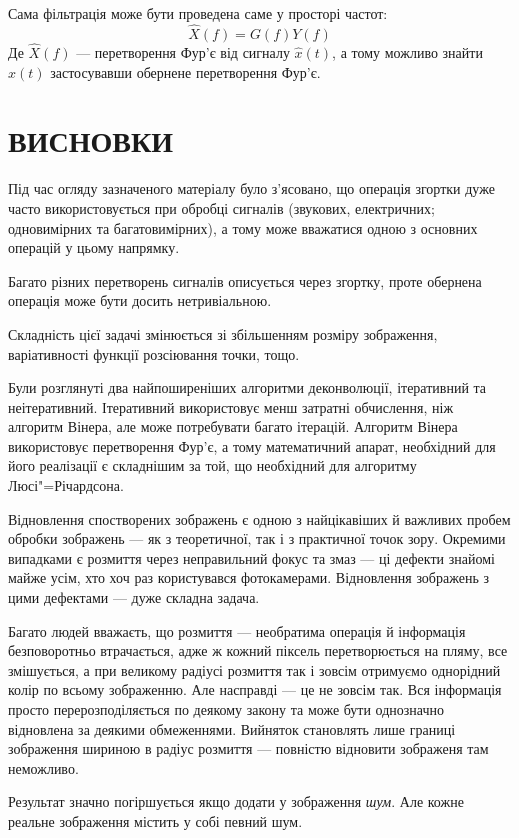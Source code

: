 \documentclass[simple,14pt,utf8,ukrainian]{eskdtext}
\begin{document}
  Сама фільтрація може бути проведена саме у просторі частот:
  \[
    \hat{X}(f) = G(f)Y(f)
  \]
  Де $\hat{X}(f)$ --- перетворення Фур’є від сигналу $\hat{x}(t)$, а тому
  можливо знайти $\hat{x}(t)$ застосувавши обернене перетворення Фур’є.
  \clearpage

\section{ВИСНОВКИ}
Під час огляду зазначеного матеріалу було з’ясовано, що операція згортки
дуже часто використовується при обробці сигналів (звукових, електричних;
одновимірних та багатовимірних), а тому може вважатися одною з основних
операцій у цьому напрямку.

Багато різних перетворень сигналів описується через згортку, проте
обернена операція може бути досить нетривіальною.

Складність цієї задачі змінюється зі збільшенням розміру зображення,
варіативності функції розсіювання точки, тощо.

Були розглянуті два найпоширеніших алгоритми деконволюції, ітеративний та
неітеративний.
Ітеративний використовує менш затратні обчислення, ніж алгоритм Вінера,
але може потребувати багато ітерацій.
Алгоритм Вінера використовує перетворення Фур’є, а тому математичний
апарат, необхідний для його реалізації є складнішим за той, що необхідний
для алгоритму Люсі"=Річардсона.


Відновлення спостворених зображень є одною з найцікавіших й важливих пробем
обробки зображень --- як з теоретичної, так і з практичної точок зору.
Окремими випадками є розмиття через неправильний фокус та змаз --- ці дефекти
знайомі майже усім, хто хоч раз користувався фотокамерами.
Відновлення зображень з цими дефектами --- дуже складна задача.

Багато людей вважаєть, що розмиття --- необратима операція й інформація
безповоротньо втрачається, адже ж кожний піксель перетворюється на пляму, все
змішується, а при великому радіусі розмиття так і зовсім отримуємо однорідний
колір по всьому зображенню.
Але насправді --- це не зовсім так.
Вся інформація просто перерозподіляється по деякому закону та може бути
однозначно відновлена за деякими обмеженнями.
Вийняток становлять лише границі зображення шириною в радіус розмиття ---
повністю відновити зображеня там неможливо.

Результат значно погіршується якщо додати у зображення \emph{шум}.
Але кожне реальне зображення містить у собі певний шум.
\end{document}
